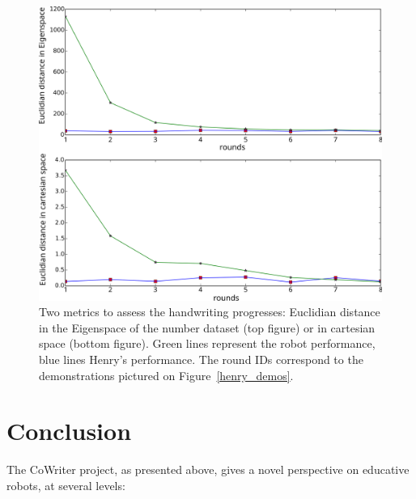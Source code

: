 \documentclass{article}
\begin{document}
\begin{figure}
    \centering
    \includegraphics[width=0.9\linewidth]{learning_6_distances}
    \caption{Two metrics to assess the handwriting progresses: Euclidian
    distance in the Eigenspace of the number dataset (top figure) or in
cartesian space (bottom figure). Green lines represent the robot performance,
blue lines Henry's performance. The round IDs correspond to the demonstrations
pictured on Figure~\ref{henry_demos}.}
    \label{henry_distances}
\end{figure}

\section{Conclusion}

The CoWriter project, as presented above, gives a novel perspective on educative
robots, at several levels:
\end{document}
